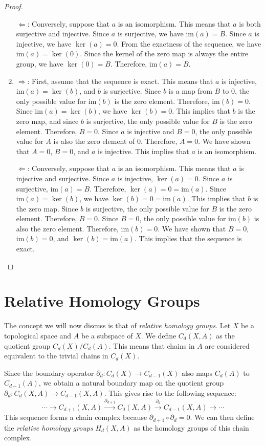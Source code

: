 \documentclass{amsart}
\begin{document}
\begin{proof}
\begin{enumerate}
	\glqq $\Leftarrow$\grqq{}: Conversely, suppose that $a$ is an isomorphism. This means that $a$ is both surjective and injective. Since $a$ is surjective, we have $\text{im}(a) = B$. Since $a$ is injective, we have $\ker(a) = 0$. From the exactness of the sequence, we have $\text{im}(a) = \ker(0)$. Since the kernel of the zero map is always the entire group, we have $\ker(0) = B$. Therefore, $\text{im}(a) = B$.
	\item \glqq $\Rightarrow$\grqq{}: First, assume that the sequence is exact. This means that $a$ is injective, $\text{im}(a) = \ker(b)$, and $b$ is surjective. Since $b$ is a map from $B$ to $0$, the only possible value for $\text{im}(b)$ is the zero element. Therefore, $\text{im}(b) = 0$. Since $\text{im}(a) = \ker(b)$, we have $\ker(b) = 0$. This implies that $b$ is the zero map, and since $b$ is surjective, the only possible value for $B$ is the zero element. Therefore, $B = 0$. Since $a$ is injective and $B = 0$, the only possible value for $A$ is also the zero element of $0$. Therefore, $A = 0$. We have shown that $A = 0$, $B = 0$, and $a$ is injective. This implies that $a$ is an isomorphism.

	\glqq $\Leftarrow$\grqq{}: Conversely, suppose that $a$ is an isomorphism. This means that $a$ is injective and surjective. Since $a$ is injective, $\ker(a) = 0$. Since $a$ is surjective, $\text{im}(a) = B$. Therefore, $\ker(a) = 0 = \text{im}(a)$. Since $\text{im}(a) = \ker(b)$, we have $\ker(b) = 0 = \text{im}(a)$. This implies that $b$ is the zero map. Since $b$ is surjective, the only possible value for $B$ is the zero element. Therefore, $B = 0$. Since $B = 0$, the only possible value for $\text{im}(b)$ is also the zero element. Therefore, $\text{im}(b) = 0$. We have shown that $B = 0$, $\text{im}(b) = 0$, and $\ker(b) = \text{im}(a)$. This implies that the sequence is exact.
\end{enumerate}
\end{proof}

\section{Relative Homology Groups}
The concept we will now discuss is that of \emph{relative homology groups}. Let $X$ be a topological space and $A$ be a subspace of $X$. We define $C_d(X,A)$ as the quotient group $C_d(X)/C_d(A)$. This means that chains in $A$ are considered equivalent to the trivial chains in $C_d(X)$.

Since the boundary operator $\partial_d: C_d(X) \rightarrow C_{d-1}(X)$ also maps $C_d(A)$ to $C_{d-1}(A)$, we obtain a natural boundary map on the quotient group $\partial_d: C_d(X,A) \rightarrow C_{d-1}(X,A)$. This gives rise to the following sequence:
\begin{equation}
\cdots \xrightarrow{} C_{d+1}(X,A) \xrightarrow{\partial_{d+1}} C_d(X,A) \xrightarrow{\partial_d} C_{d-1}(X,A) \rightarrow \cdots
\end{equation}
This sequence forms a chain complex because $\partial_{d+1}\circ\partial_{d} = 0$. We can then define the \emph{relative homology groups} $H_d(X,A)$ as the homology groups of this chain complex.
\end{document}
